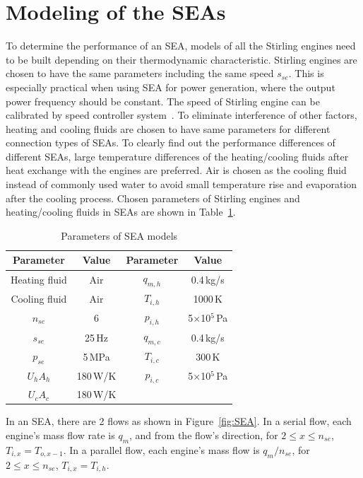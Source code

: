 \section{Modeling of the SEAs}

To determine the performance of an SEA, models of all the Stirling engines need to be built depending on their thermodynamic characteristic. Stirling engines are chosen to have the same parameters including the same speed $s_{se}$. This is especially practical when using SEA for power generation, where the output power frequency should be constant. The speed of Stirling engine can be calibrated by speed controller system~\cite{Hooshang2016}. To eliminate interference of other factors, heating and cooling fluids are chosen to have same parameters for different connection types of SEAs. To clearly find out the performance differences of different SEAs, large temperature differences of the heating/cooling fluids after heat exchange with the engines are preferred. Air is chosen as the cooling fluid instead of commonly used water to avoid small temperature rise and evaporation after the cooling process. Chosen parameters of Stirling engines and heating/cooling fluids in SEAs are shown in Table~\ref{tab:parameters}.

\begin{table}[htbp]
	\caption{Parameters of SEA models}
	\begin{center}
	\begin{tabular}{cccc}
		\toprule
		Parameter		&	Value	& Parameter	&	Value\\
		\midrule
		Heating fluid	&	Air		&	$q_{m,h}$	&	0.4\,kg/s\\
		Cooling fluid	&	Air	&	$T_{i,h}$	&	1000\,K\\
		$n_{se}$	&	6	&	$p_{i,h}$	&	5$\times$10$^5$\,Pa\\
		$s_{se}$	&	25\,Hz	&	$q_{m,c}$	&	0.4\,kg/s\\
		$p_{se}$		&	5\,MPa	&	$T_{i,c}$	&	300\,K\\
		$U_hA_h$	&	180\,W/K	&	$p_{i,c}$	&	5$\times$10$^5$\,Pa\\
		$U_cA_c$		&	180\,W/K	&&\\
		\bottomrule
	\end{tabular}
	\end{center}
	\label{tab:parameters}
\end{table}

In an SEA, there are 2 flows as shown in Figure~\ref{fig:SEA}. In a serial flow, each engine's mass flow rate is $q_m$, and from the flow's direction, for $2\leqslant{}x\leqslant{}n_{se}$, $T_{i,x} = T_{o,x-1}$. In a parallel flow, each engine's mass flow is $q_m/n_{se}$, for $2\leqslant{}x\leqslant{}n_{se}$, $T_{i,x} = T_{i,h}$.

